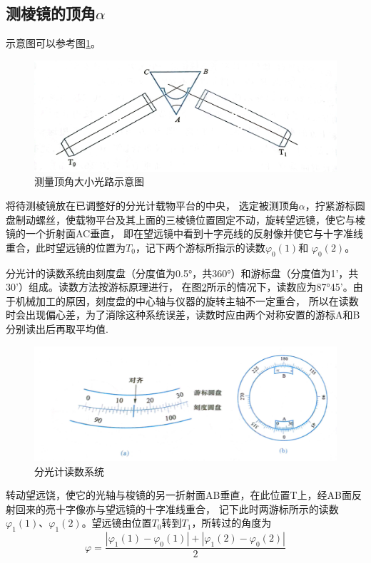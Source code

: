 \documentclass{ctexart}
\begin{document}
    \subsection{测棱镜的顶角$\alpha$}
    示意图可以参考图\ref{cedingjiao}。
    \begin{figure}[H]
      \centering
      \includegraphics[height=0.2\textwidth,width=1\textwidth]{cedingjiaoguanglu.jpg}
      \caption{测量顶角大小光路示意图}\label{cedingjiao}
    \end{figure}

    将待测棱镜放在已调整好的分光计载物平台的中央，
    选定被测顶角$\alpha$，拧紧游标圆盘制动螺丝，使载物平台及其上面的三棱镜位置固定不动，旋转望远镜，使它与棱镜的一个折射面AC垂直，
    即在望远镜中看到十字亮线的反射像并使它与十字准线重合，此时望远镜的位置为$T_{0}$，记下两个游标所指示的读数$\varphi_{0}(1)$和
    $\varphi_{0}(2)$。

    分光计的读数系统由刻度盘（分度值为0.5°，共360°）和游标盘（分度值为1'，共30'）组成。读数方法按游标原理进行，
    在图\ref{kedupan}所示的情况下，读数应为87°45'。由于机械加工的原因，刻度盘的中心轴与仪器的旋转主轴不一定重合，
    所以在读数时会出现偏心差，为了消除这种系统误差，读数时应由两个对称安置的游标A和B分别读出后再取平均值.
    \begin{figure}[H]
      \centering
      \includegraphics[height=0.4\textwidth,width=1\textwidth]{kedupan.jpg}
      \caption{分光计读数系统}\label{kedupan}
    \end{figure}

    转动望远饶，使它的光轴与梭镜的另一折射面AB垂直，在此位置T上，经AB面反射回来的亮十字像亦与望远镜的十字准线重合，
    记下此时两游标所示的读数$\varphi_{1}(1)$、$\varphi_{1}(2)$。望远镜由位置$T_{0}$转到$T_{1}$，所转过的角度为
    \begin{equation}
      \varphi=\frac{|\varphi_{1}(1)-\varphi_{0}(1)|+|\varphi_{1}(2)-\varphi_{0}(2)|}{2}
    \end{equation}
\end{document}
